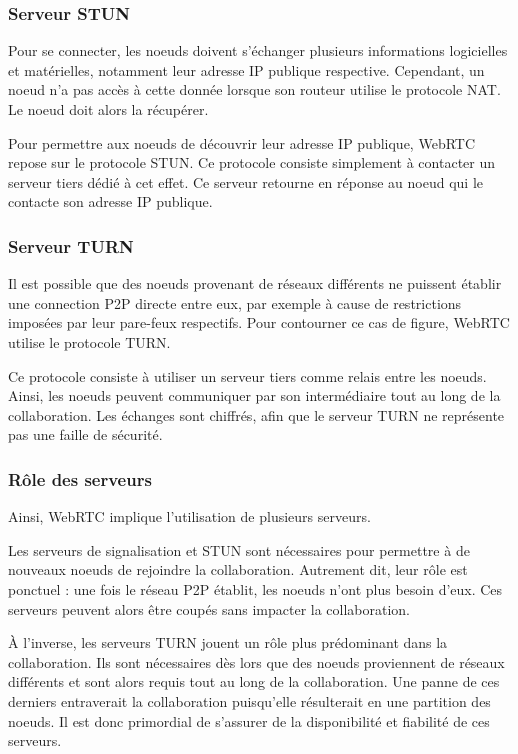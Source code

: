 \subsubsection{Serveur STUN}

Pour se connecter, les noeuds doivent s'échanger plusieurs informations logicielles et matérielles, notamment leur adresse IP publique respective.
Cependant, un noeud n'a pas accès à cette donnée lorsque son routeur utilise le protocole NAT.
Le noeud doit alors la récupérer.

Pour permettre aux noeuds de découvrir leur adresse IP publique, \ac{WebRTC} repose sur le protocole STUN.
Ce protocole consiste simplement à contacter un serveur tiers dédié à cet effet.
Ce serveur retourne en réponse au noeud qui le contacte son adresse IP publique.

\subsubsection{Serveur TURN}

Il est possible que des noeuds provenant de réseaux différents ne puissent établir une connection \ac{P2P} directe entre eux, par exemple à cause de restrictions imposées par leur pare-feux respectifs.
Pour contourner ce cas de figure, \ac{WebRTC} utilise le protocole TURN.

Ce protocole consiste à utiliser un serveur tiers comme relais entre les noeuds.
Ainsi, les noeuds peuvent communiquer par son intermédiaire tout au long de la collaboration.
Les échanges sont chiffrés, afin que le serveur TURN ne représente pas une faille de sécurité.

\subsubsection{Rôle des serveurs}

Ainsi, \ac{WebRTC} implique l'utilisation de plusieurs serveurs.

Les serveurs de signalisation et STUN sont nécessaires pour permettre à de nouveaux noeuds de rejoindre la collaboration.
Autrement dit, leur rôle est ponctuel : une fois le réseau \ac{P2P} établit, les noeuds n'ont plus besoin d'eux.
Ces serveurs peuvent alors être coupés sans impacter la collaboration.

À l'inverse, les serveurs TURN jouent un rôle plus prédominant dans la collaboration.
Ils sont nécessaires dès lors que des noeuds proviennent de réseaux différents et sont alors requis tout au long de la collaboration.
Une panne de ces derniers entraverait la collaboration puisqu'elle résulterait en une partition des noeuds.
Il est donc primordial de s'assurer de la disponibilité et fiabilité de ces serveurs.

